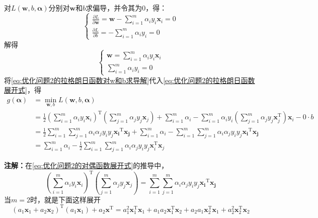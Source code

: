 \documentclass[withoutpreface,bwprint]{NoteBook}
\begin{document}
对$L(\mathbf{w},b,\bm{\alpha})$分别对$\mathbf{w}$和$b$求偏导，并令其为0，得：
\begin{equation}
    \label{eq:优化问题2的拉格朗日函数对w和b求导}
    \begin{cases}
        \frac{\partial L}{\partial \mathbf{w}} = \mathbf{w} - \sum_{i=1}^{m} \alpha_i y_i \mathbf{x}_i = 0 \\
        \frac{\partial L}{\partial b} = - \sum_{i=1}^{m} \alpha_i y_i = 0
    \end{cases}
\end{equation}
解得
\begin{equation}
    \label{eq:优化问题2的拉格朗日函数对w和b求导解}
    \begin{cases}
        \mathbf{w} = \sum_{i=1}^{m} \alpha_i y_i \mathbf{x}_i  \\
        \sum_{i=1}^{m} \alpha_i y_i = 0
    \end{cases}
\end{equation}
将\cref{eq:优化问题2的拉格朗日函数对w和b求导解}代入\cref{eq:优化问题2的拉格朗日函数展开式}，得
\begin{align}
    \label{eq:优化问题2的对偶函数展开式}
    g(\bm{\alpha}) 
    &= \min_{\mathbf{w},b} L(\mathbf{w},b,\bm{\alpha}) \nonumber \\
    &= \frac{1}{2} \left( \sum_{i=1}^{m} \alpha_i y_i \mathbf{x}_i \right)^\mathrm{T} \left( \sum_{j=1}^{m} \alpha_j y_j \mathbf{x}_j \right) + \sum_{i=1}^{m} \alpha_i - \sum_{i=1}^{m} \alpha_i y_i \left( \sum_{j=1}^{m} \alpha_j y_j \mathbf{x}_j^\mathrm{T} \right) \mathbf{x}_i - 0 \cdot b \nonumber \\
    &= \frac{1}{2} \sum_{i=1}^{m} \sum_{j=1}^{m} \alpha_i \alpha_j y_i y_j \mathbf{x_i}^\mathrm{T} \mathbf{x_j} + \sum_{i=1}^{m} \alpha_i - \sum_{i=1}^{m} \sum_{j=1}^{m} \alpha_i \alpha_j y_i y_j \mathbf{x_i}^\mathrm{T} \mathbf{x_j} \nonumber \\
    &= \sum_{i=1}^{m} \alpha_i - \frac{1}{2} \sum_{i=1}^{m} \sum_{j=1}^{m} \alpha_i \alpha_j y_i y_j \mathbf{x}_i^\mathrm{T} \mathbf{x}_j
\end{align}

\textbf{注解：}在\cref{eq:优化问题2的对偶函数展开式}的推导中，
$$
\left( \sum_{i=1}^{m} \alpha_i y_i \mathbf{x}_i \right)^\mathrm{T} \left( \sum_{j=1}^{m} \alpha_j y_j \mathbf{x}_j \right) 
= \sum_{i=1}^{m} \sum_{j=1}^{m} \alpha_i \alpha_j y_i y_j \mathbf{x_i}^\mathrm{T} \mathbf{x_j}
$$
当$m=2$时，就是下面这样展开
$$
(a_1 \mathbf{x}_1 + a_2 \mathbf{x}_2)^\mathrm{T} (a_1 \mathbf{x}_1) + a_2 \mathbf{x}^\mathrm{T}
= a_1^2 \mathbf{x}_1^\mathrm{T} \mathbf{x}_1 + a_1 a_2 \mathbf{x}_1^\mathrm{T} \mathbf{x}_2 + a_2 a_1 \mathbf{x}_2^\mathrm{T} \mathbf{x}_1 + a_2^2 \mathbf{x}_2^\mathrm{T} \mathbf{x}_2 
$$
\end{document}
